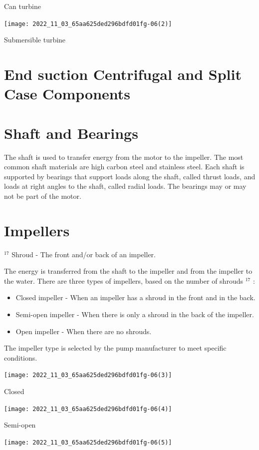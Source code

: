 \documentclass[10pt]{article}
\begin{document}
Can turbine

\texttt{[image: 2022\_11\_03\_65aa625ded296bdfd01fg-06(2)]}

Submersible turbine

\section{End suction Centrifugal and Split Case Components}
\section{Shaft and Bearings}
The shaft is used to transfer energy from the motor to the impeller. The most common shaft materials are high carbon steel and stainless steel. Each shaft is supported by bearings that support loads along the shaft, called thrust loads, and loads at right angles to the shaft, called radial loads. The bearings may or may not be part of the motor.

\section{Impellers}
${ }^{17}$ Shroud - The front and/or back of an impeller.

The energy is transferred from the shaft to the impeller and from the impeller to the water. There are three types of impellers, based on the number of shrouds ${ }^{17}$ :

\begin{itemize}
  \item Closed impeller - When an impeller has a shroud in the front and in the back.

  \item Semi-open impeller - When there is only a shroud in the back of the impeller.

  \item Open impeller - When there are no shrouds.

\end{itemize}
The impeller type is selected by the pump manufacturer to meet specific conditions.

\texttt{[image: 2022\_11\_03\_65aa625ded296bdfd01fg-06(3)]}

Closed

\texttt{[image: 2022\_11\_03\_65aa625ded296bdfd01fg-06(4)]}

Semi-open

\texttt{[image: 2022\_11\_03\_65aa625ded296bdfd01fg-06(5)]}
\end{document}
